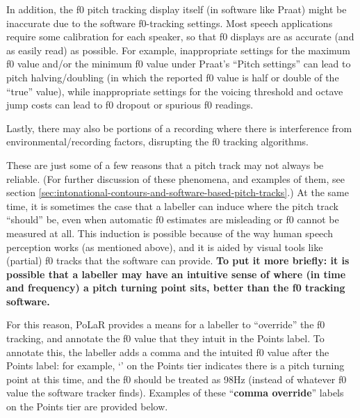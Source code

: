 In addition, the f0 pitch tracking display itself (in software like Praat) might be inaccurate due to the software f0-tracking settings. Most speech applications require some calibration for each speaker, so that f0 displays are as accurate (and as easily read) as possible. For example, inappropriate settings for the maximum f0 value and/or the minimum f0 value under Praat’s “Pitch settings” can lead to pitch halving\slash doubling (in which the reported f0 value is half or double of the “true” value), while inappropriate settings for the voicing threshold and octave jump costs can lead to f0 dropout or spurious f0 readings.

Lastly, there may also be portions of a recording where there is interference from environmental\slash recording factors, disrupting the f0 tracking algorithms.

These are just some of a few reasons that a pitch track may not always be reliable. (For further discussion of these phenomena, and examples of them, see section \ref{sec:intonational-contours-and-software-based-pitch-tracks}.) At the same time, it is sometimes the case that a labeller can induce where the pitch track “should” be, even when automatic f0 estimates are misleading or f0 cannot be measured at all. This induction is possible because of the way human speech perception works (as mentioned above), and it is aided by visual tools like (partial) f0 tracks that the software can provide. \textbf{To put it more briefly: it is possible that a labeller may have an intuitive sense of where (in time and frequency) a pitch turning point sits, better than the f0 tracking software.}

For this reason, PoLaR provides a means for a labeller to “override” the f0 tracking, and annotate the f0 value that they intuit in the Points label. To annotate this, the labeller adds a comma and the intuited f0 value after the Points label: for example, ‘’ on the Points tier indicates there is a pitch turning point at this time, and the f0 should be treated as 98Hz (instead of whatever f0 value the software tracker finds). Examples of these “\textbf{comma override}” labels on the Points tier are provided below.

